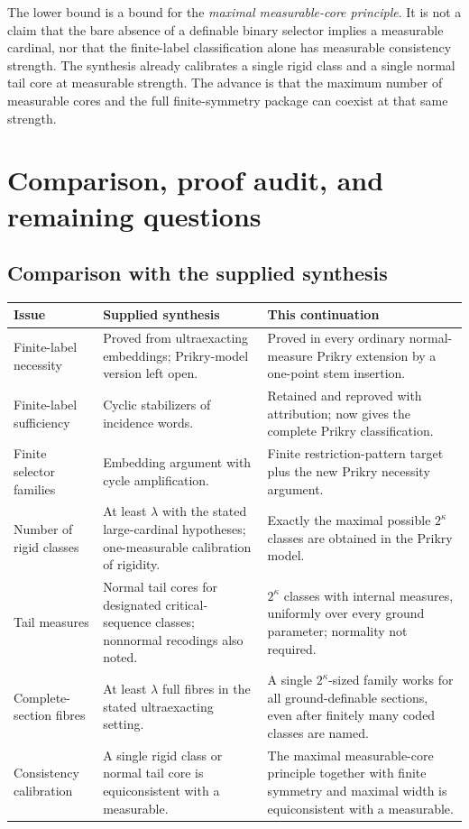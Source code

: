 \documentclass[11pt,letterpaper]{article}
\theoremstyle{definition}
\numberwithin{equation}{section}
\begin{document}
The lower bound is a bound for the \emph{maximal measurable-core principle}. It is not a claim that the bare absence of a definable binary selector implies a measurable cardinal, nor that the finite-label classification alone has measurable consistency strength. The synthesis already calibrates a single rigid class and a single normal tail core at measurable strength. The advance is that the maximum number of measurable cores and the full finite-symmetry package can coexist at that same strength.

\clearpage
\section{Comparison, proof audit, and remaining questions}\label{sec:audit}

\subsection{Comparison with the supplied synthesis}

\begin{center}
\small
\renewcommand{\arraystretch}{1.24}
\begin{tabularx}{\textwidth}{@{}P{.25\textwidth}YY@{}}
\toprule
\textbf{Issue}&\textbf{Supplied synthesis}&\textbf{This continuation}\\
\midrule
Finite-label necessity&Proved from ultraexacting embeddings; Prikry-model version left open.&Proved in every ordinary normal-measure Prikry extension by a one-point stem insertion.\\
Finite-label sufficiency&Cyclic stabilizers of incidence words.&Retained and reproved with attribution; now gives the complete Prikry classification.\\
Finite selector families&Embedding argument with cycle amplification.&Finite restriction-pattern target plus the new Prikry necessity argument.\\
Number of rigid classes&At least $\lambda$ with the stated large-cardinal hypotheses; one-measurable calibration of rigidity.&Exactly the maximal possible $2^\kappa$ classes are obtained in the Prikry model.\\
Tail measures&Normal tail cores for designated critical-sequence classes; nonnormal recodings also noted.&$2^\kappa$ classes with internal measures, uniformly over every ground parameter; normality not required.\\
Complete-section fibres&At least $\lambda$ full fibres in the stated ultraexacting setting.&A single $2^\kappa$-sized family works for all ground-definable sections, even after finitely many coded classes are named.\\
Consistency calibration&A single rigid class or normal tail core is equiconsistent with a measurable.&The maximal measurable-core principle together with finite symmetry and maximal width is equiconsistent with a measurable.\\
\bottomrule
\end{tabularx}
\end{center}
\end{document}
